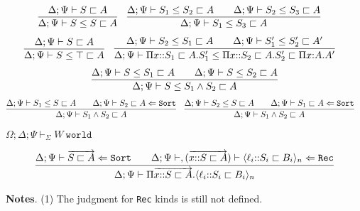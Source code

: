 \documentclass[letterpaper, 11pt]{article}
\newcommand{\Lar}{\Leftarrow}
\newcommand{\Rec}{\texttt{Rec}}
\newcommand{\Sort}{\texttt{Sort}}
\newcommand{\world}{\texttt{world}}
\begin{document}
    \begin{align*}
      & \infer{\Delta; \Psi \vdash S \leq S \sqsubset A}{\Delta; \Psi \vdash S \sqsubset A} &
      & \infer{\Delta; \Psi \vdash S_1 \leq S_3 \sqsubset A}
        {
          \Delta; \Psi \vdash S_1 \leq S_2 \sqsubset A
          &&
          \Delta; \Psi \vdash S_2 \leq S_3 \sqsubset A
        }
    \end{align*}
    \begin{align*}
      & \infer{\Delta; \Psi \vdash S \leq \top \sqsubset A}{\Delta; \Psi \vdash S \sqsubset A} &
      & \infer{\Delta; \Psi \vdash \Pi x{::}S_1 \sqsubset A. S_1' \leq \Pi x{::}S_2 \sqsubset A. S_2' \sqsubset \Pi x{:}A.A'}
        {
          \Delta; \Psi \vdash S_2 \leq S_1 \sqsubset A
          &&
          \Delta; \Psi \vdash S_1' \leq S_2' \sqsubset A'
        }
    \end{align*}
    \begin{align*}
      \infer{\Delta; \Psi \vdash S \leq S_1 \land S_2 \sqsubset A}
            { 
              \Delta; \Psi \vdash S \leq S_1 \sqsubset A
              &&
              \Delta; \Psi \vdash S \leq S_2 \sqsubset A
            }
    \end{align*}
    \begin{align*}
      & \infer{\Delta; \Psi \vdash S_1 \land S_2 \sqsubset A}
        { 
          \Delta; \Psi \vdash S_1 \leq S \sqsubset A
          &&
          \Delta; \Psi \vdash S_2 \sqsubset A \Lar \Sort
        } &
      & \infer{\Delta; \Psi \vdash S_1 \land S_2 \sqsubset A}
        { 
          \Delta; \Psi \vdash S_2 \leq S \sqsubset A
          &&
          \Delta; \Psi \vdash S_1 \sqsubset A \Lar \Sort
        }
    \end{align*}

    $\boxed{\Omega; \Delta; \Psi \vdash_\Sigma W \ \world}$
    
    \begin{align*}
      \infer{\Delta; \Psi \vdash \Pi \overrightarrow{x{::}S \sqsubset A}.\langle \ell_i {::} S_i \sqsubset B_i \rangle_n}
            {
              \Delta; \Psi \vdash \overrightarrow{ S \sqsubset A} \Lar \Sort
              &&
              \Delta; \Psi \vdash, (\overrightarrow{x{::}S \sqsubset A}) \vdash \langle \ell_i {::} S_i \sqsubset B_i \rangle_n \Lar \Rec
            }
    \end{align*}

    \textbf{Notes}. (1) The judgment for \texttt{Rec} kinds is still not defined.
    
\end{document}
